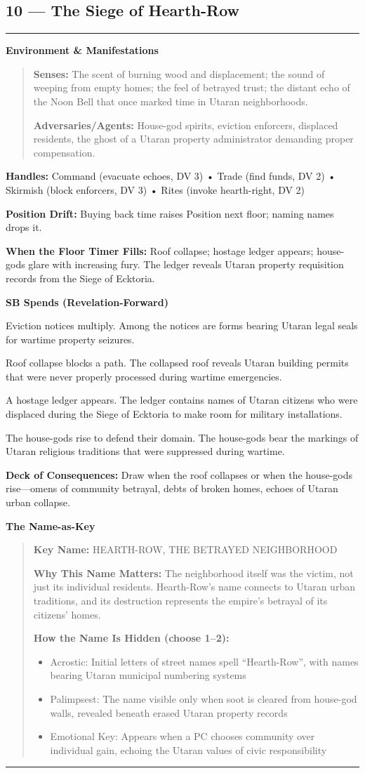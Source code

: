 \documentclass[18pt, letterpaper, twoside]{article}
\newenvironment{floorbox}[1]{%
    \begin{center}
    \begin{minipage}{0.95\textwidth}
    \subsection*{#1}
    \vspace{-0.5em}
    \rule{\textwidth}{0.5pt}
    \vspace{0.5em}
}{%
    \vspace{0.5em}
    \rule{\textwidth}{0.5pt}
    \end{minipage}
    \end{center}
}
\newenvironment{gmnote}[1]{%
    \vspace{0.5em}
    \noindent\textbf{#1}
    \begin{quote}
}{%
    \end{quote}
    \vspace{0.5em}
}
\newcommand{\handles}[1]{\noindent\textbf{Handles:} #1\par}
\newcommand{\sbitem}[2]{\item[#1 SB:] #2}
\newcommand{\deckdraw}[1]{\noindent\textbf{Deck of Consequences:} #1\par}
\newcommand{\keyname}[1]{\noindent\textbf{Key Name:} #1\par}
\newcommand{\nameimportance}[1]{\noindent\textbf{Why This Name Matters:} #1\par}
\begin{document}
\begin{floorbox}{10 --- The Siege of Hearth-Row}
\begin{gmnote}{Environment \& Manifestations}
\textbf{Senses:} The scent of burning wood and displacement; the sound of weeping from empty homes; the feel of betrayed trust; the distant echo of the Noon Bell that once marked time in Utaran neighborhoods.

\textbf{Adversaries/Agents:} House-god spirits, eviction enforcers, displaced residents, the ghost of a Utaran property administrator demanding proper compensation.
\end{gmnote}

\handles{Command (evacuate echoes, DV 3) • Trade (find funds, DV 2) • Skirmish (block enforcers, DV 3) • Rites (invoke hearth-right, DV 2)}

\textbf{Position Drift:} Buying back time raises Position next floor; naming names drops it.

\textbf{When the Floor Timer Fills:} Roof collapse; hostage ledger appears; house-gods glare with increasing fury. The ledger reveals Utaran property requisition records from the Siege of Ecktoria.

\textbf{SB Spends (Revelation-Forward)}
\begin{description}[leftmargin=*, style=unboxed]
    \sbitem{1}{Eviction notices multiply. Among the notices are forms bearing Utaran legal seals for wartime property seizures.}
    \sbitem{2}{Roof collapse blocks a path. The collapsed roof reveals Utaran building permits that were never properly processed during wartime emergencies.}
    \sbitem{3}{A hostage ledger appears. The ledger contains names of Utaran citizens who were displaced during the Siege of Ecktoria to make room for military installations.}
    \sbitem{4+}{The house-gods rise to defend their domain. The house-gods bear the markings of Utaran religious traditions that were suppressed during wartime.}
\end{description}

\deckdraw{Draw when the roof collapses or when the house-gods rise---omens of community betrayal, debts of broken homes, echoes of Utaran urban collapse.}

\begin{gmnote}{The Name-as-Key}
\keyname{HEARTH-ROW, THE BETRAYED NEIGHBORHOOD}
\nameimportance{The neighborhood itself was the victim, not just its individual residents. Hearth-Row's name connects to Utaran urban traditions, and its destruction represents the empire's betrayal of its citizens' homes.}

\textbf{How the Name Is Hidden (choose 1--2):}
\begin{itemize}[leftmargin=*]
    \item Acrostic: Initial letters of street names spell ``Hearth-Row'', with names bearing Utaran municipal numbering systems
    \item Palimpsest: The name visible only when soot is cleared from house-god walls, revealed beneath erased Utaran property records
    \item Emotional Key: Appears when a PC chooses community over individual gain, echoing the Utaran values of civic responsibility
\end{itemize}


\end{gmnote}
\end{floorbox}
\end{document}
